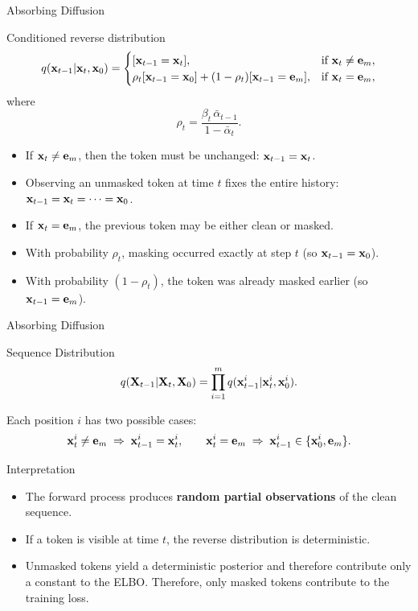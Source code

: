 \documentclass{beamer}
\renewcommand{\eqpause}{}
\begin{document}
\begin{frame}{Absorbing Diffusion}
	\begin{block}{Conditioned reverse distribution}
		\vspace{-0.5cm}
		\[
			q(\mathbf{x}_{t-1} | \mathbf{x}_t, \mathbf{x}_0) =
			\begin{cases}
				[\mathbf{x}_{t-1} = \mathbf{x}_t], 
				& \text{if } \mathbf{x}_t \neq \mathbf{e}_m, \\
				\rho_t[\mathbf{x}_{t-1} = \mathbf{x}_0] + (1-\rho_t)[\mathbf{x}_{t-1} = \mathbf{e}_m], 
				& \text{if } \mathbf{x}_t = \mathbf{e}_m,
			\end{cases}
		\]
		where
		\[
		\rho_t = \frac{\beta_t\,\bar\alpha_{t-1}}{1-\bar\alpha_t}.
		\]
	\end{block}
	\eqpause
	\begin{itemize}
		\item If $\mathbf{x}_t \neq \mathbf{e}_m$, then the token must be unchanged:
		$\mathbf{x}_{t-1} = \mathbf{x}_t$.
		\item Observing an unmasked token at time $t$ fixes the entire history:
		$\mathbf{x}_{t-1} = \mathbf{x}_t = \cdots = \mathbf{x}_0$.
		\eqpause
		\item If $\mathbf{x}_t = \mathbf{e}_m$, the previous token may be either clean or masked.
		\item With probability $\rho_t$, masking occurred exactly at step $t$
		(so $\mathbf{x}_{t-1} = \mathbf{x}_0$).
        \item With probability $(1 - \rho_t)$, the token was already masked earlier
		(so $\mathbf{x}_{t-1} = \mathbf{e}_m$).
	\end{itemize}
\end{frame}
\begin{frame}{Absorbing Diffusion}
    \begin{block}{Sequence Distribution}
        \vspace{-0.3cm}
        \[
            q(\mathbf{X}_{t-1} | \mathbf{X}_t,\mathbf{X}_0)
            =
            \prod_{i=1}^m q(\mathbf{x}_{t-1}^i | \mathbf{x}_t^i, \mathbf{x}_0^i).
        \]
    \end{block}
	Each position $i$ has two possible cases:
	\[
		\mathbf{x}_t^i \neq \mathbf{e}_m
		\;\Rightarrow\;
		\mathbf{x}_{t-1}^i = \mathbf{x}_t^i,
		\qquad
		\mathbf{x}_t^i = \mathbf{e}_m
		\;\Rightarrow\;
		\mathbf{x}_{t-1}^i \in \{\mathbf{x}_0^i, \mathbf{e}_m\}.
	\]
    \vspace{-0.5cm}
    \eqpause
    \begin{block}{Interpretation}
        \begin{itemize}
            \item The forward process produces \textbf{random partial observations} of the clean sequence.
            \item If a token is visible at time $t$, the reverse distribution is deterministic.
            \item Unmasked tokens yield a deterministic posterior and therefore contribute only a constant to the ELBO. Therefore, only masked tokens contribute to the training loss.
        \end{itemize}
    \end{block}
\end{frame}
\end{document}
